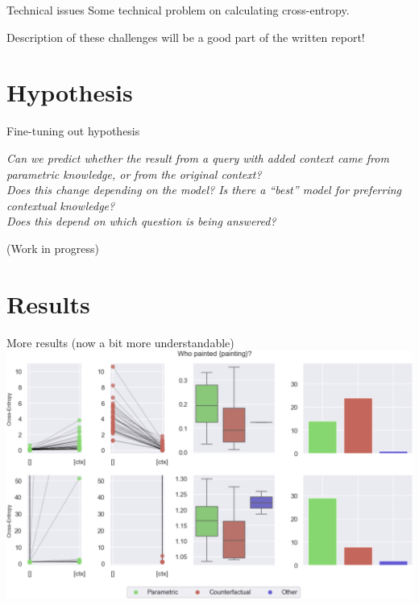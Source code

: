 \documentclass[9pt]{beamer}
\begin{document}
\begin{frame}{Technical issues}
	Some technical problem on calculating cross-entropy.

	\vfill{}

	Description of these challenges will be a good part of the written report!
\end{frame}

\section{Hypothesis}
\begin{frame}{Fine-tuning out hypothesis}
	\begin{large}
		\slshape
		Can we predict whether the result from a query with added context came from parametric knowledge, or from the original context? \\[1em]
		Does this change depending on the model? Is there a ``best'' model for preferring contextual knowledge? \\[1em]
		Does this depend on which question is being answered?
	\end{large}

	\vfill{}
	\begin{footnotesize}
		(Work in progress)
	\end{footnotesize}
\end{frame}

\section{Results}

\begin{frame}{More results (now a bit more understandable)}
	\centering
	\includegraphics[width=\textwidth]{who_painted_painting.png}
\end{frame}
\end{document}
